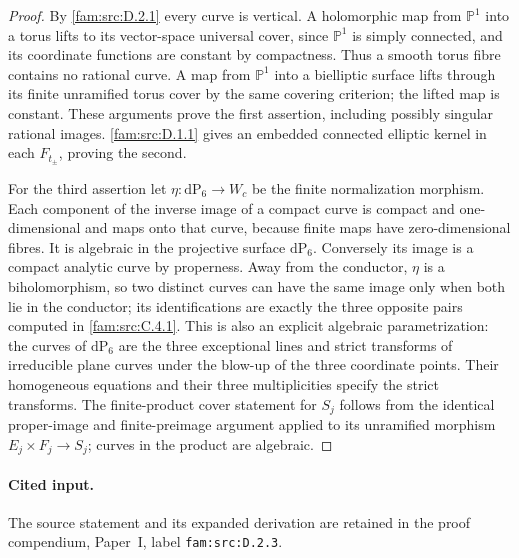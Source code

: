 \begin{proof}
By \ref{fam:src:D.2.1} every curve is vertical. A holomorphic map from
\(\mathbb P^1\) into a torus lifts to its vector-space universal cover,
since \(\mathbb P^1\) is simply connected, and its coordinate functions
are constant by compactness. Thus a smooth torus fibre contains no
rational curve. A map from \(\mathbb P^1\) into a bielliptic surface
lifts through its finite unramified torus cover by the same covering
criterion; the lifted map is constant. These arguments prove the first
assertion, including possibly singular rational images.
\ref{fam:src:D.1.1} gives an embedded connected elliptic kernel in each \(F_{t_\pm}\),
proving the second.

For the third assertion let \(\eta:\mathrm{dP}_6\to W_c\) be the finite
normalization morphism. Each component of the inverse image of a compact
curve is compact and one-dimensional and maps onto that curve, because
finite maps have zero-dimensional fibres. It is algebraic in the
projective surface \(\mathrm{dP}_6\). Conversely its image is a compact
analytic curve by properness. Away from the conductor, \(\eta\) is a
biholomorphism, so two distinct curves can have the same image only when
both lie in the conductor; its identifications are exactly the three
opposite pairs computed in \ref{fam:src:C.4.1}. This is also an explicit algebraic
parametrization: the curves of \(\mathrm{dP}_6\) are the three exceptional
lines and strict transforms of irreducible plane curves under the blow-up
of the three coordinate points. Their homogeneous equations and their
three multiplicities specify the strict transforms. The finite-product
cover statement for \(S_j\) follows from the identical proper-image and
finite-preimage argument applied to its unramified morphism
\(E_j\times F_j\to S_j\); curves in the product are algebraic.
\end{proof}


\paragraph{Cited input.} \label{fam:src:D.2.3}\label{fam:st:D.2.3}The source statement and its expanded derivation are retained in the proof compendium, Paper~I, label \nolinkurl{fam:src:D.2.3}.\par




